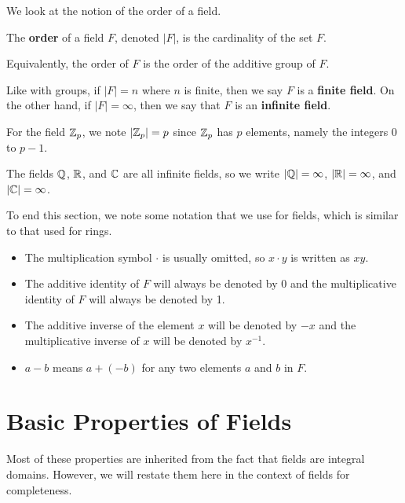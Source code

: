 We look at the notion of the order of a field.
\begin{definition}
    The \textbf{order} of a field $F$, denoted $|F|$, is the cardinality of the set $F$.
\end{definition}
\begin{remark}
    Equivalently, the order of $F$ is the order of the additive group of $F$.
\end{remark}

Like with groups, if $|F| = n$ where $n$ is finite, then we say $F$ is a \textbf{finite field}. On the other hand, if $|F| = \infty$, then we say that $F$ is an \textbf{infinite field}.

\begin{example}
    For the field $\mathbb{Z}_p$, we note $|\mathbb{Z}_p| = p$ since $\mathbb{Z}_p$ has $p$ elements, namely the integers 0 to $p - 1$.
\end{example}
\begin{example}
    The fields $\mathbb{Q}$, $\mathbb{R}$, and $\mathbb{C}$ are all infinite fields, so we write $|\mathbb{Q}| = \infty$, $|\mathbb{R}| = \infty$, and $|\mathbb{C}| = \infty$.
\end{example}

To end this section, we note some notation that we use for fields, which is similar to that used for rings.
\begin{itemize}
    \item The multiplication symbol $\cdot$ is usually omitted, so $x \cdot y$ is written as $xy$.
    \item The additive identity of $F$ will always be denoted by 0 and the multiplicative identity of $F$ will always be denoted by 1.
    \item The additive inverse of the element $x$ will be denoted by $-x$ and the multiplicative inverse of $x$ will be denoted by $x^{-1}$.
    \item $a - b$ means $a + (-b)$ for any two elements $a$ and $b$ in $F$.
\end{itemize}

\newpage

\section{Basic Properties of Fields}
Most of these properties are inherited from the fact that fields are integral domains. However, we will restate them here in the context of fields for completeness.

